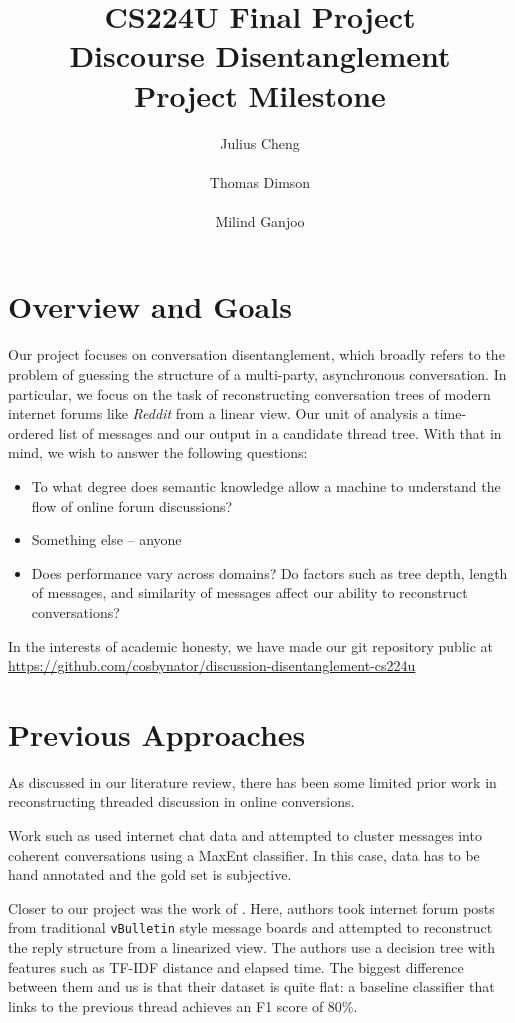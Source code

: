 \documentclass[10pt]{article}
\title{{\small CS224U Final Project} \\ Discourse Disentanglement \\{\small Project Milestone}}
\author{Julius Cheng \\
  \\\And
  Thomas Dimson  \\
  \\\And
  Milind Ganjoo \\
}
\date{}
\begin{document}
\maketitle

\section{Overview and Goals}
Our project focuses on conversation disentanglement, which broadly refers to
the problem of guessing the structure of a multi-party, asynchronous
conversation. In particular, we focus on the task of reconstructing conversation
trees of modern internet forums like \textit{Reddit} from a linear view. Our unit of 
analysis a time-ordered list of messages and our output in a candidate thread tree. 
With that in mind, we wish to answer the following questions:

\begin{itemize}
  \item To what degree does semantic knowledge allow a machine to understand the 
    flow of online forum discussions?
  \item {Something else -- anyone}
  \item Does performance vary across domains? Do factors such as tree depth,
    length of messages, and similarity of messages affect our ability to
    reconstruct conversations? 
\end{itemize}

In the interests of academic honesty, we have made our git repository public at
\url{https://github.com/cosbynator/discussion-disentanglement-cs224u}

\section{Previous Approaches}
\label{sec:approaches}
As discussed in our literature review, there has been some limited prior 
work in reconstructing threaded discussion in online conversions. 

Work such as \cite{Elsner2008a} 
used internet chat data and attempted to cluster messages into coherent 
conversations using a MaxEnt classifier. In this case, data has to be hand annotated and
the gold set is subjective.

Closer to our project was the work of \cite{Aumayr2011a}. Here, authors took
internet forum posts from traditional \texttt{vBulletin} style message boards
and attempted to reconstruct the reply structure from a linearized view. The authors
use a decision tree with features such as TF-IDF distance and elapsed time. The biggest
difference between them and us is that their dataset is quite flat: a baseline classifier
that links to the previous thread achieves an F1 score of 80\%.
\end{document}
